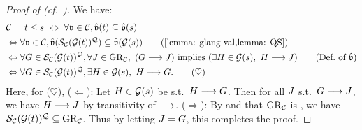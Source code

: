 \begin{proof}[Proof of  (cf.\ {\cite[Thm.\ 18]{nakamuraExistentialCalculiRelations2023}})]
    We have:
    \begin{align*}
         & \algclass \models \term[1] \le \term[2] \ \Leftrightarrow\   \forall \val \in \algclass, \hat{\val}(\term[1]) \subseteq \hat{\val}(\term[2])                                                                                          \\
         & \Leftrightarrow \forall \val \in \algclass, \hat{\val}(\FillS_{\algclass}(\glang(\term[1]))^{\FillQ}) \subseteq \hat{\val}(\glang(\term[2])) \tag{\Cref{lemma: glang val,lemma: QS}}                                                                                                                                                      \\
         & \Leftrightarrow \forall \graph \in \FillS_{\algclass}(\glang(\term[1]))^{\FillQ}, \forall \graph[3] \in \allgraph_{\algclass},\  (\graph \homo \graph[3]) \mbox{ implies } (\exists \graph[2] \in \glang(\term[2]), \ \graph[2] \homo \graph[3])                                                \tag{Def.\ of $\hat{\val}$}         \\
         & \Leftrightarrow \forall \graph \in \FillS_{\algclass}(\glang(\term[1]))^{\FillQ}, \exists \graph[2] \in \glang(\term[2]), \ \graph[2] \homo \graph[1]. \tag{$\heartsuit$}
    \end{align*}
    Here, for ($\heartsuit$),
    ($\Leftarrow$):
    Let $\graph[2] \in \glang(\term[2])$ be s.t.\  $\graph[2] \homo \graph[1]$.
    Then for all $\graph[3]$ s.t.\ $\graph[1] \homo \graph[3]$,
    we have $\graph[2] \homo \graph[3]$ by transitivity of $\longrightarrow$.
    ($\Rightarrow$):
    By  and that $\allgraph_{\algclass}$ is ,
    we have $\FillS_{\algclass}(\glang(\term[1]))^{\FillQ} \subseteq \allgraph_{\algclass}$.
    Thus by letting $\graph[3] = \graph$, this completes the proof.
\end{proof}









